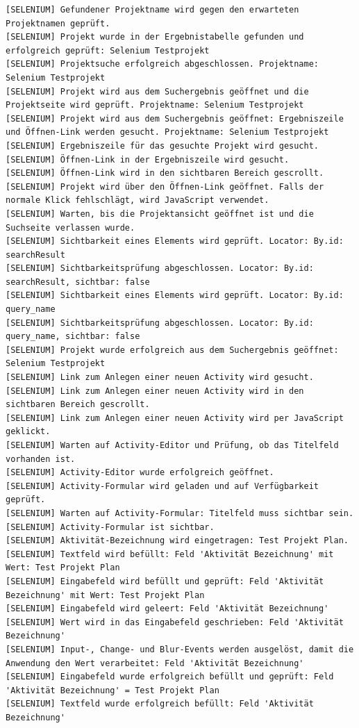 \begin{lstlisting}[caption={Selenium -- Neue Activity (Erfolgreich)}, label={lst:sel_new_act_ok}, style=logStyle]
[SELENIUM] Gefundener Projektname wird gegen den erwarteten Projektnamen geprüft.
[SELENIUM] Projekt wurde in der Ergebnistabelle gefunden und erfolgreich geprüft: Selenium Testprojekt
[SELENIUM] Projektsuche erfolgreich abgeschlossen. Projektname: Selenium Testprojekt
[SELENIUM] Projekt wird aus dem Suchergebnis geöffnet und die Projektseite wird geprüft. Projektname: Selenium Testprojekt
[SELENIUM] Projekt wird aus dem Suchergebnis geöffnet: Ergebniszeile und Öffnen-Link werden gesucht. Projektname: Selenium Testprojekt
[SELENIUM] Ergebniszeile für das gesuchte Projekt wird gesucht.
[SELENIUM] Öffnen-Link in der Ergebniszeile wird gesucht.
[SELENIUM] Öffnen-Link wird in den sichtbaren Bereich gescrollt.
[SELENIUM] Projekt wird über den Öffnen-Link geöffnet. Falls der normale Klick fehlschlägt, wird JavaScript verwendet.
[SELENIUM] Warten, bis die Projektansicht geöffnet ist und die Suchseite verlassen wurde.
[SELENIUM] Sichtbarkeit eines Elements wird geprüft. Locator: By.id: searchResult
[SELENIUM] Sichtbarkeitsprüfung abgeschlossen. Locator: By.id: searchResult, sichtbar: false
[SELENIUM] Sichtbarkeit eines Elements wird geprüft. Locator: By.id: query_name
[SELENIUM] Sichtbarkeitsprüfung abgeschlossen. Locator: By.id: query_name, sichtbar: false
[SELENIUM] Projekt wurde erfolgreich aus dem Suchergebnis geöffnet: Selenium Testprojekt
[SELENIUM] Link zum Anlegen einer neuen Activity wird gesucht.
[SELENIUM] Link zum Anlegen einer neuen Activity wird in den sichtbaren Bereich gescrollt.
[SELENIUM] Link zum Anlegen einer neuen Activity wird per JavaScript geklickt.
[SELENIUM] Warten auf Activity-Editor und Prüfung, ob das Titelfeld vorhanden ist.
[SELENIUM] Activity-Editor wurde erfolgreich geöffnet.
[SELENIUM] Activity-Formular wird geladen und auf Verfügbarkeit geprüft.
[SELENIUM] Warten auf Activity-Formular: Titelfeld muss sichtbar sein.
[SELENIUM] Activity-Formular ist sichtbar.
[SELENIUM] Aktivität-Bezeichnung wird eingetragen: Test Projekt Plan.
[SELENIUM] Textfeld wird befüllt: Feld 'Aktivität Bezeichnung' mit Wert: Test Projekt Plan
[SELENIUM] Eingabefeld wird befüllt und geprüft: Feld 'Aktivität Bezeichnung' mit Wert: Test Projekt Plan
[SELENIUM] Eingabefeld wird geleert: Feld 'Aktivität Bezeichnung'
[SELENIUM] Wert wird in das Eingabefeld geschrieben: Feld 'Aktivität Bezeichnung'
[SELENIUM] Input-, Change- und Blur-Events werden ausgelöst, damit die Anwendung den Wert verarbeitet: Feld 'Aktivität Bezeichnung'
[SELENIUM] Eingabefeld wurde erfolgreich befüllt und geprüft: Feld 'Aktivität Bezeichnung' = Test Projekt Plan
[SELENIUM] Textfeld wurde erfolgreich befüllt: Feld 'Aktivität Bezeichnung'

\end{lstlisting}
